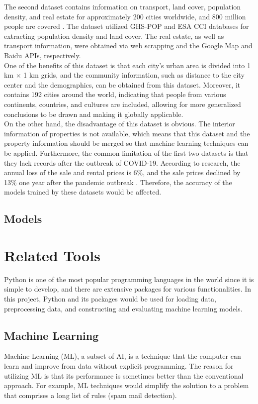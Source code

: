 \documentclass[12pt,twoside]{report}
\begin{document}
The second dataset contains information on transport, land cover, population density, and real estate for approximately 200 cities worldwide, and 800 million people are covered \citep{RN22}. The dataset utilized GHS-POP and ESA CCI databases for extracting population density and land cover. The real estate, as well as transport information, were obtained via web scrapping and the Google Map and Baidu APIs, respectively.
\\ 

One of the benefits of this dataset is that each city's urban area is divided into 1 km $\times$ 1 km grids, and the community information, such as distance to the city center and the demographics, can be obtained from this dataset. Moreover, it contains 192 cities around the world, indicating that people from various continents, countries, and cultures are included, allowing for more generalized conclusions to be drawn and making it globally applicable. 
\\

On the other hand, the disadvantage of this dataset is obvious. The interior information of properties is not available, which means that this dataset and the property information should be merged so that machine learning techniques can be applied. Furthermore, the common limitation of the first two datasets is that they lack records after the outbreak of COVID-19. According to research, the annual loss of the sale and rental prices is 6\%, and the sale prices declined by 13\% one year after the pandemic outbreak \citep{RN29}. Therefore, the accuracy of the models trained by these datasets would be affected. 

\subsection{Models}

\section{Related Tools}
Python is one of the most popular programming languages in the world since it is simple to develop, and there are extensive packages for various functionalities. In this project, Python and its packages would be used for loading data, preprocessing data, and constructing and evaluating machine learning models. 

\subsection{Machine Learning}
Machine Learning (ML), a subset of AI, is a technique that the computer can learn and improve from data without explicit programming. The reason for utilizing ML is that its performance is sometimes better than the conventional approach. For example, ML techniques would simplify the solution to a problem that comprises a long list of rules (spam mail detection). 
\\
\end{document}
